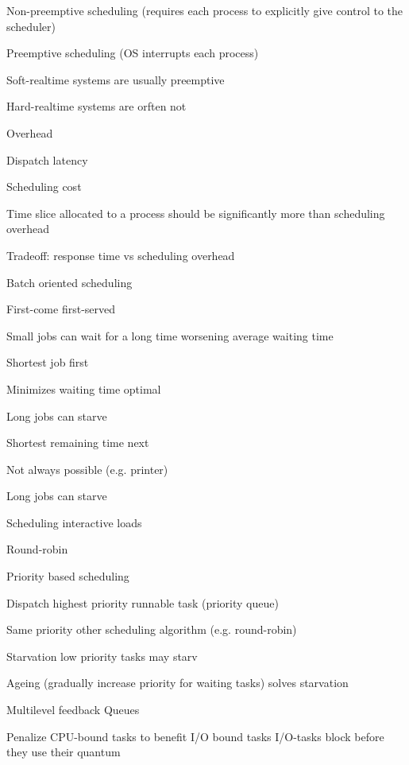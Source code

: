 	\enumstart
		\item Non-preemptive scheduling (requires each process to explicitly give control to the scheduler)
		\item Preemptive scheduling (OS interrupts each process)
		\item Soft-realtime systems are usually preemptive
		\item Hard-realtime systems are orften not
	\enumend
	\item Overhead
	\enumstart
		\item Dispatch latency
		\item Scheduling cost
		\item Time slice allocated to a process should be significantly more than scheduling overhead
		\item Tradeoff: response time vs scheduling overhead
	\enumend
	\item Batch oriented scheduling
	\enumstart
		\item First-come first-served
		\enumstart
			\item Small jobs can wait for a long time \arrow worsening average waiting time
		\enumend
		\item Shortest job first
		\enumstart
			\item Minimizes waiting time \arrow optimal
			\item Long jobs can starve
		\enumend
		\item Shortest remaining time next
		\enumstart
			\item Not always possible (e.g. printer)
			\item Long jobs can starve
		\enumend
	\enumend
	\item Scheduling interactive loads
	\enumstart
		\item Round-robin
		\item Priority based scheduling
		\enumstart
			\item Dispatch highest priority runnable task (priority queue)
			\item Same priority \arrow other scheduling algorithm (e.g. round-robin)
			\item Starvation \arrow low priority tasks may starv
			\item Ageing (gradually increase priority for waiting tasks) \arrow solves starvation
			\item Multilevel feedback Queues
			\enumstart
				\item Penalize CPU-bound tasks to benefit I/O bound tasks \arrow I/O-tasks block before they use their quantum
